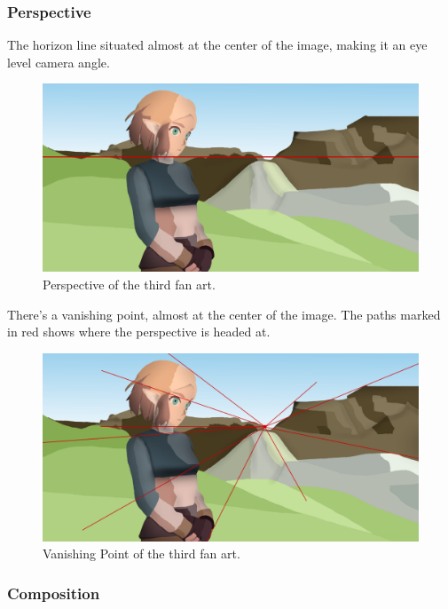 \documentclass{cup-pan}
\begin{document}
        \subsubsection{Perspective}
            The horizon line situated almost at the center of the image, making it an eye level camera angle. 
            \begin{figure}[H]
                \includegraphics[width=\textwidth]{Fanart3/0_Analisi/horizonte.png}
                \caption{Perspective of the third fan art.}
            \end{figure}

            There's a vanishing point, almost at the center of the image. The paths marked in red shows where the perspective is headed at. 
            \begin{figure}[H]
                \includegraphics[width=\textwidth]{Fanart3/0_Analisi/puntofuga.png}
                \caption{Vanishing Point of the third fan art.}
            \end{figure}

        \subsubsection{Composition}
\end{document}
